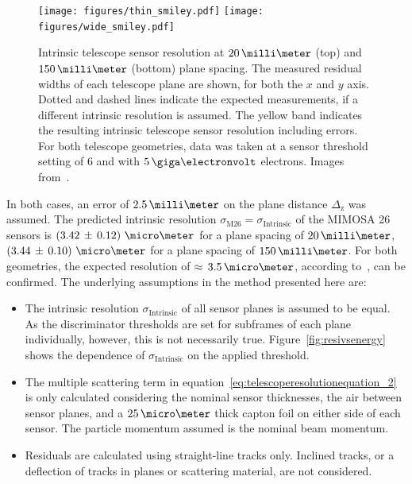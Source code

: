 \begin{figure}[tbp]
\centering
\texttt{[image: figures/thin\_smiley.pdf]}
\texttt{[image: figures/wide\_smiley.pdf]}
\caption[Intrinsic telescope sensor resolution at $20\,\milli\meter$ and $150\,\milli\meter$ plane spacing~\cite{ref:thomas}]{Intrinsic telescope sensor resolution at $20\,\milli\meter$ (top)
 and $150\,\milli\meter$ (bottom) plane spacing.
The measured residual widths of each telescope plane are shown, for both the $x$ and $y$ axis. Dotted and dashed lines indicate the expected measurements, if a different intrinsic resolution is assumed.
The yellow band indicates the resulting intrinsic telescope sensor resolution including errors.
For both telescope geometries, data was taken at a sensor threshold setting of $6$ and with $5\,\giga\electronvolt$ electrons.
Images from~\cite{ref:thomas}.}
\label{fig:smiley}
\end{figure}

In both cases, an error of $2.5\,\milli\meter$ on the plane distance $\Delta_{\textrm{z}}$ was assumed.
The predicted intrinsic resolution $\sigma_{\textrm{M26}} = \sigma_{\textrm{Intrinsic}}$ of the MIMOSA 26 sensors is \allowbreak$\left( 3.42\,\pm\, \allowbreak 0.12 \right)\,\micro\meter$ for a plane spacing of
$20\,\milli\meter$, $\left( 3.44\,\pm\,0.10 \right)\,\micro\meter$ for a plane spacing of $150\,\milli\meter$.
For both geometries, the expected resolution of $\approx\,3.5\,\micro\meter$, according to~\cite{ref:mimosa26}, can be confirmed.
The underlying assumptions in the method presented here are:

\begin{itemize}
\item The intrinsic resolution $\sigma_{\textrm{Intrinsic}}$ of all sensor planes is assumed to be equal.
As the discriminator thresholds are set for subframes of each plane individually, however, this is not necessarily true.
Figure~\ref{fig:resivsenergy} shows the dependence of $\sigma_{\textrm{Intrinsic}}$ on the applied threshold.

\item The multiple scattering term in equation~\ref{eq:telescoperesolutionequation_2} is only calculated considering the nominal sensor thicknesses, the air between sensor planes,
 and a $25\,\micro\meter$ thick capton foil on either side of each sensor.
The particle momentum assumed is the nominal beam momentum.

\item Residuals are calculated using straight-line tracks only.
Inclined tracks, or a deflection of tracks in planes or scattering material, are not considered.
\end{itemize}

